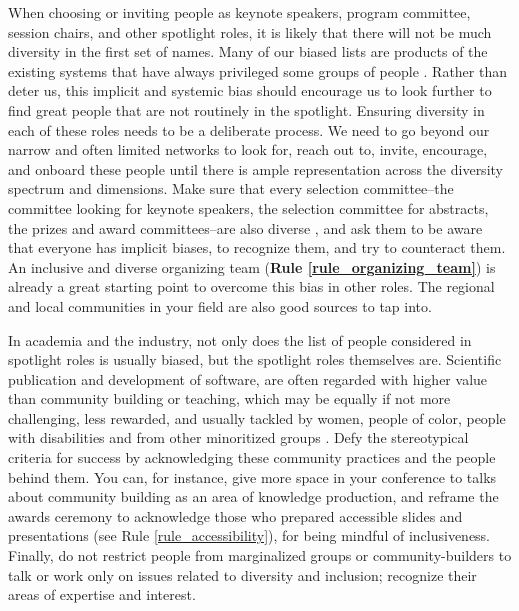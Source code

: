 \documentclass[10pt,letterpaper]{article}
\begin{document}
When choosing or inviting people as keynote speakers, program committee, session chairs, and other spotlight roles, it is likely that there will not be much diversity in the first set of names. 
Many of our biased lists are products of the existing systems that have always privileged some groups of people \cite{dwyerNoticeWhoScience2021,swartzScienceValueDiversity2019,wongBuildDiversityScience2020,dignazioUnicornsJanitorsNinjas2020}. 
Rather than deter us, this implicit and systemic bias should encourage us to look further to find great people that are not routinely in the spotlight. 
Ensuring diversity in each of these roles needs to be a deliberate process. 
We need to go beyond our narrow and often limited networks to look for, reach out to, invite, encourage, and onboard these people until there is ample representation across the diversity spectrum and dimensions. 
Make sure that every selection committee--the committee looking for keynote speakers, the selection committee for abstracts, the prizes and award committees--are also diverse \cite{swartzScienceValueDiversity2019, wongBuildDiversityScience2020}, and ask them to be aware that everyone has implicit biases, to recognize them, and try to counteract them. 
An inclusive and diverse organizing team (\textbf{Rule \ref{rule_organizing_team}}) is already a great starting point to overcome this bias in other roles. The regional and local communities in your field are also good sources to tap into. 

In academia and the industry, not only does the list of people considered in spotlight roles is usually biased, but the spotlight roles themselves are.
Scientific publication and development of software, are often regarded with higher value than community building or teaching, which may be equally if not more challenging, less rewarded, and usually tackled by women, people of color, people with disabilities and from other minoritized groups \cite{cheng2020x+, burfordHomelinessMeantHaving2020}.
Defy the stereotypical criteria for success by acknowledging these community practices and the people behind them.
You can, for instance, give more space in your conference to talks about community building as an area of knowledge production, and reframe the awards ceremony to acknowledge those who prepared accessible slides and presentations (see Rule \ref{rule_accessibility}), for being mindful of inclusiveness. 
Finally, do not restrict people from marginalized groups or community-builders to talk or work only on issues related to diversity and inclusion; recognize their areas of expertise and interest. 
\end{document}
